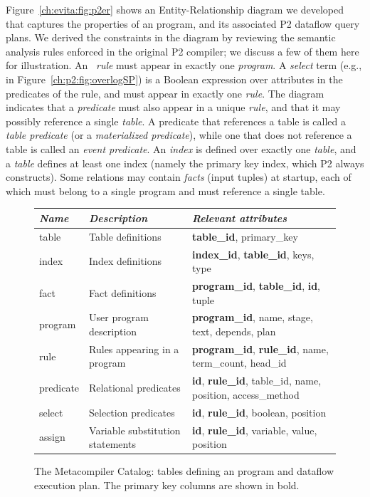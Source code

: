 Figure~\ref{ch:evita:fig:p2er} shows an Entity-Relationship diagram we
developed that captures the properties of an \OVERLOG program, and its
associated P2 dataflow query plans.  We derived the constraints in the diagram
by reviewing the semantic analysis rules enforced in the original P2 compiler;
we discuss a few of them here for illustration.  An \OVERLOG~{\em rule} must
appear in exactly one {\em program}.  A {\em select} term (e.g.,
 in Figure~\ref{ch:p2:fig:overlogSP}) is a
Boolean expression over attributes in the predicates of the rule, and must
appear in exactly one {\em rule}.  The diagram indicates that a {\em predicate}
must also appear in a unique {\em rule}, and that it may possibly reference a
single {\em table}.  A predicate that references a table is called a {\em table
predicate} (or a \emph{materialized predicate}), while one that does not
reference a table is called an {\em event predicate}.  An {\em index} is
defined over exactly one {\em table}, and a {\em table} defines at least one
index (namely the primary key index, which P2 always constructs).  Some
relations may contain {\em facts} (input tuples) at startup, each of which must
belong to a single program and must reference a single table.

\begin{figure}
\ssp
\begin{tabular}{|l|l|p{8cm}|} \hline
{\it Name}& {\it Description} & {\it Relevant attributes} \\ \hline\hline
table     & Table definitions & {\bf table\_id}, primary\_key\\ \hline
index     & Index definitions & {\bf index\_id}, {\bf table\_id}, keys, type \\ \hline
fact      & Fact definitions  & {\bf program\_id}, {\bf table\_id}, {\bf id}, tuple\\ \hline
program   & User program description     & {\bf program\_id}, name, stage, text, depends, plan \\ \hline
rule      & Rules appearing in a program   & {\bf program\_id}, {\bf rule\_id}, name,  term\_count, head\_id \\ \hline
predicate & Relational predicates  & {\bf id}, {\bf rule\_id}, table\_id, name, position, access\_method \\ \hline
select    & Selection predicates  & {\bf id}, {\bf rule\_id}, boolean, position \\  \hline
assign    & Variable substitution statements & {\bf id}, {\bf rule\_id}, variable, value, position \\ \hline 
\end{tabular}
\caption{The Metacompiler Catalog: tables defining an \OVERLOG program and dataflow execution plan.
         The primary key columns are shown in bold. }
\label{tbl:catalog}
\end{figure}

